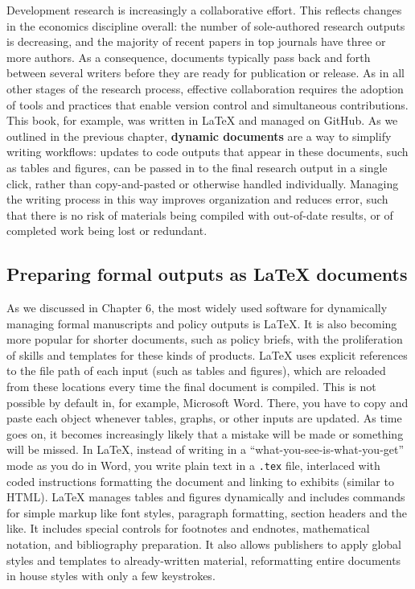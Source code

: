 Development research is increasingly a collaborative effort.
This reflects changes in the economics discipline overall:
the number of sole-authored research outputs is decreasing,
and the majority of recent papers in top journals have three or more
authors.
As a consequence, documents typically pass back and forth between several writers
before they are ready for publication or release.
As in all other stages of the research process,
effective collaboration requires the adoption of tools and practices
that enable version control and simultaneous contributions.
This book, for example, was written in {\LaTeX} and managed on GitHub.
As we outlined in the previous chapter,
\textbf{dynamic documents} are a way to simplify writing workflows:
updates to code outputs that appear in these documents, such as tables and figures,
can be passed in to the final research output in a single click,
rather than copy-and-pasted or otherwise handled individually.
Managing the writing process in this way
improves organization and reduces error,
such that there is no risk of materials being compiled
with out-of-date results, or of completed work being lost or redundant.

\subsection{Preparing formal outputs as {\LaTeX} documents}

As we discussed in Chapter 6, the most widely used software
for dynamically managing formal manuscripts and policy outputs is {\LaTeX}.
It is also becoming more popular for shorter documents,
such as policy briefs,
with the proliferation of skills and templates for these kinds of products.
{\LaTeX} uses explicit references to the file path of each input (such as tables and figures),
which are reloaded from these locations every time the final document is compiled.
This is not possible by default in, for example, Microsoft Word.
There, you have to copy and paste each object
whenever tables, graphs, or other inputs are updated.
As time goes on, it becomes increasingly likely
that a mistake will be made or something will be missed.
In {\LaTeX}, instead of writing in a
``what-you-see-is-what-you-get'' mode as you do in Word,
you write plain text in a \texttt{.tex} file,
interlaced with coded instructions formatting the document and linking to exhibits (similar to HTML).
{\LaTeX} manages tables and figures dynamically
and includes commands for simple markup
like font styles, paragraph formatting, section headers and the like.
It includes special controls for
footnotes and endnotes, mathematical notation, and bibliography preparation.
It also allows publishers to apply global styles and templates to already-written material,
reformatting entire documents in house styles with only a few keystrokes.

